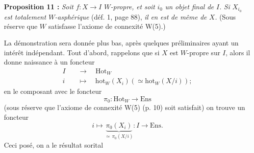 \textbf{Proposition 11 :} \textit{Soit $f : X \longrightarrow I$ $W$-propre, et soit $i_0$ un objet final de $I$. Si $X_{i_0}$ est totalement $W$-asphérique} (déf. 1, page 88), \textit{il en est de même de $X$.} (Sous réserve que $W$ satisfasse l'axiome de connexité W(5).)

La démonstration sera donnée plus bas, après quelques préliminaires ayant un intérêt indépendant. Tout d'abord, rappelons que si $X$ est $W$-propre sur $I$, alors il donne naissance à un foncteur
\[
\begin{aligned}
I \quad &\longrightarrow \quad \mathrm{Hot}_W\\
i \quad &\longmapsto \quad \mathrm{hot}_W(X_i)(\simeq \mathrm{hot}_W(X/i));
\end{aligned}
\]
en le composant avec le foncteur
\[
\pi_0 : \mathrm{Hot}_W \longrightarrow \mathrm{Ens}
\]
(sous réserve que l'axiome de connexité W(5) (p. 10) soit satisfait)
on trouve un foncteur
\[
i \longmapsto \underbrace{\pi_0(X_i)}_{\simeq\, \pi_0(X/i)} : I \longrightarrow \mathrm{Ens}.
\]
Ceci posé, on a le résultat sorital

